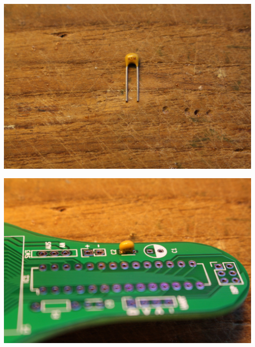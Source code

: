 \documentclass{article}
\begin{document}
\begin{minipage}[b]{0.5\textwidth}
	\includegraphics[width=\textwidth]{Bilder2021/IMG_8124.JPG}
\end{minipage}
\begin{minipage}[b]{0.5\textwidth}
	\includegraphics[width=\textwidth]{Bilder2021/IMG_8125.JPG}
\end{minipage}

\vspace{0.5cm}
\end{document}
